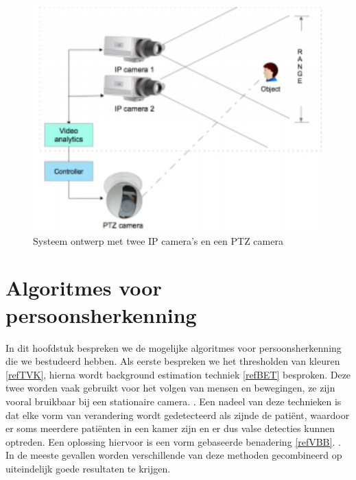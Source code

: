\begin{figure}[hbp]
	\includegraphics[scale=0.5]{IPPTZCamera}
	\caption{Systeem ontwerp met twee IP camera's en een PTZ camera}
	\label{imgIPC2}
\end{figure}


\section{Algoritmes voor persoonsherkenning}
\label{refAVPH}
In dit hoofdstuk bespreken we de mogelijke algoritmes voor persoonsherkenning die we bestudeerd hebben. Als eerste bespreken we het thresholden van kleuren \ref{refTVK}, hierna wordt background estimation techniek \ref{refBET} besproken. Deze twee worden vaak gebruikt voor het volgen van mensen en bewegingen, ze zijn vooral bruikbaar bij een stationaire camera. \cite{bibIRC}. Een nadeel van deze technieken is dat elke vorm van verandering wordt gedetecteerd als zijnde de pati\"ent, waardoor er soms meerdere pati\"enten in een kamer zijn en er dus valse detecties kunnen optreden. Een oplossing hiervoor is een vorm gebaseerde benadering \ref{refVBB}. \cite{bibIRC}. In de meeste gevallen worden verschillende van deze methoden gecombineerd op uiteindelijk goede resultaten te krijgen. 


